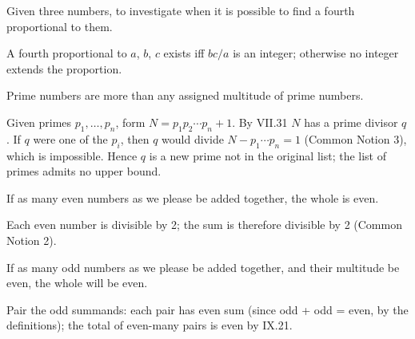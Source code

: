 \documentclass{rrxiv}
\begin{document}
\begin{claim}
\label{prop:IX.19}
Given three numbers, to investigate when it is possible to find a
fourth proportional to them.
\end{claim}
\begin{evidence}[Proof of IX.19]
\label{ev:IX.19}
A fourth proportional to $a$, $b$, $c$ exists iff $bc / a$ is an
integer; otherwise no integer extends the proportion.
\end{evidence}

\begin{claim}
\label{prop:IX.20}
Prime numbers are more than any assigned multitude of prime numbers.
\end{claim}
\begin{evidence}[Proof of IX.20]
\label{ev:IX.20}
Given primes $p_1, \dots, p_n$, form $N = p_1 p_2 \cdots p_n + 1$.
By VII.31 $N$ has a prime divisor $q$.  If $q$ were one of the
$p_i$, then $q$ would divide $N - p_1 \cdots p_n = 1$ (Common Notion
3), which is impossible.  Hence $q$ is a new prime not in the
original list; the list of primes admits no upper bound.
\end{evidence}

\begin{claim}
\label{prop:IX.21}
If as many even numbers as we please be added together, the whole is
even.
\end{claim}
\begin{evidence}[Proof of IX.21]
\label{ev:IX.21}
Each even number is divisible by 2; the sum is therefore divisible
by 2 (Common Notion 2).
\end{evidence}

\begin{claim}
\label{prop:IX.22}
If as many odd numbers as we please be added together, and their
multitude be even, the whole will be even.
\end{claim}
\begin{evidence}[Proof of IX.22]
\label{ev:IX.22}
Pair the odd summands: each pair has even sum (since odd + odd =
even, by the definitions); the total of even-many pairs is even by
IX.21.
\end{evidence}
\end{document}
